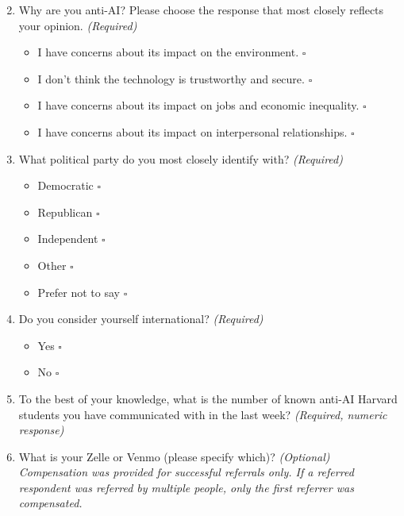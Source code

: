 \documentclass[11pt,a4paper,twocolumn,twoside]{rho-class/rho}
\begin{document}
\begin{enumerate}
    \setcounter{enumi}{1}

    \item Why are you anti-AI? Please choose the response that most closely reflects your opinion. \hfill \textit{(Required)}
    \begin{itemize}
        \item I have concerns about its impact on the environment. \quad $\square$
        \item I don't think the technology is trustworthy and secure. \quad $\square$
        \item I have concerns about its impact on jobs and economic inequality. \quad $\square$
        \item I have concerns about its impact on interpersonal relationships. \quad $\square$
    \end{itemize}

    \item What political party do you most closely identify with? \hfill \textit{(Required)}
    \begin{itemize}
        \item Democratic \quad $\square$
        \item Republican \quad $\square$
        \item Independent \quad $\square$
        \item Other \quad $\square$
        \item Prefer not to say \quad $\square$
    \end{itemize}

    \item Do you consider yourself international? \hfill \textit{(Required)}
    \begin{itemize}
        \item Yes \quad $\square$
        \item No \quad $\square$
    \end{itemize}

    \item To the best of your knowledge, what is the number of known anti-AI Harvard students you have communicated with in the last week? \hfill \textit{(Required, numeric response)}

    \bigskip

    \item What is your Zelle or Venmo (please specify which)? \hfill \textit{(Optional)}\\
    \textit{Compensation was provided for successful referrals only. If a referred respondent was referred by multiple people, only the first referrer was compensated.}


\end{enumerate}
\end{document}
